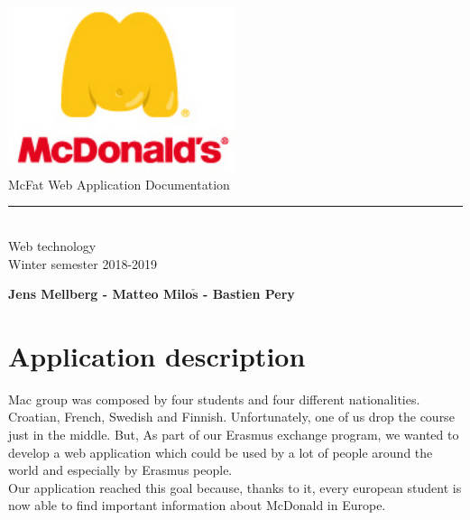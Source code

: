 \documentclass[12pt]{article}
\begin{document}
\begin{titlepage}
        \begin{center}
            \includegraphics[width=0.5\textwidth]{mcdonalds-fat-logo.jpg}\\
            \vspace{1cm}
            \Large McFat Web Application Documentation\\
            \rule{5cm}{.5pt}\\
            \vspace{0.6cm}
            {\Large Web technology}\\
            \vspace{0.1cm}
            {\Large Winter semester 2018-2019} \\
            \vspace{5em}

            \textbf{Jens Mellberg - Matteo Milo$\mathbf{\check{s}}$ - Bastien Pery}\\
        \end{center}

    \end{titlepage}

    \renewcommand{\contentsname}{\color{color_section}\\Table of contents}
    \tableofcontents

    \newpage

    {\color{color_section}\section{Application description}}
    Mac group was composed by four students and four different nationalities.
        Croatian, French, Swedish and Finnish.
        Unfortunately, one of us drop the course just in the middle. 
        But, As part of our Erasmus exchange program, 
        we wanted to develop a web application which could be used by a lot 
        of people around the world and especially by Erasmus people.\\

        \noindent Our application reached this goal because, thanks to it,
        every european student is now able to find important 
        information about McDonald in Europe.\\
\end{document}
